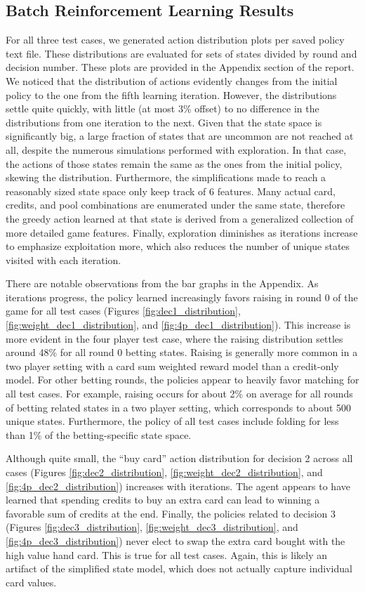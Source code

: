 \documentclass{article}
\begin{document}
\subsection{Batch Reinforcement Learning Results}
For all three test cases, we generated action distribution plots per saved policy text file. These distributions are evaluated for sets of states divided by round and decision number. These plots are provided in the Appendix section of the report. We noticed that the distribution of actions evidently changes from the initial policy to the one from the fifth learning iteration. However, the distributions settle quite quickly, with little (at most 3\% offset) to no difference in the distributions from one iteration to the next. Given that the state space is significantly big, a large fraction of states that are uncommon are not reached at all, despite the numerous simulations performed with exploration. In that case, the actions of those states remain the same as the ones from the initial policy, skewing the distribution. Furthermore, the simplifications made to reach a reasonably sized state space only keep track of 6 features. Many actual card, credits, and pool combinations are enumerated under the same state, therefore the greedy action learned at that state is derived from a generalized collection of more detailed game features. Finally, exploration diminishes as iterations increase to emphasize exploitation more, which also reduces the number of unique states visited with each iteration.

There are notable observations from the bar graphs in the Appendix. As iterations progress, the policy learned increasingly favors raising in round 0 of the game for all test cases (Figures \ref{fig:dec1_distribution}, \ref{fig:weight_dec1_distribution}, and \ref{fig:4p_dec1_distribution}). This increase is more evident in the four player test case, where the raising distribution settles around 48\% for all round 0 betting states. Raising is generally more common in a two player setting with a card sum weighted reward model than a credit-only model. For other betting rounds, the policies appear to heavily favor matching for all test cases. For example, raising occurs for about 2\% on average for all rounds of betting related states in a two player setting, which corresponds to about 500 unique states. Furthermore, the policy of all test cases include folding for less than 1\% of the betting-specific state space.

Although quite small, the ``buy card'' action distribution for decision 2 across all cases (Figures \ref{fig:dec2_distribution}, \ref{fig:weight_dec2_distribution}, and \ref{fig:4p_dec2_distribution}) increases with iterations. The agent appears to have learned that spending credits to buy an extra card can lead to winning a favorable sum of credits at the end. Finally, the policies related to decision 3 (Figures \ref{fig:dec3_distribution}, \ref{fig:weight_dec3_distribution}, and \ref{fig:4p_dec3_distribution}) never elect to swap the extra card bought with the high value hand card. This is true for all test cases. Again, this is likely an artifact of the simplified state model, which does not actually capture individual card values.
\end{document}
